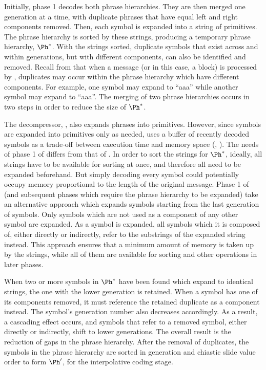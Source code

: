Initially, phase 1 decodes both phrase hierarchies.  
They are then merged one generation at a time, with duplicate
phrases that have equal left and right components removed.  
Then, each symbol
is expanded into a string of primitives.  The phrase hierarchy
is sorted by these strings, producing a temporary phrase
hierarchy, $\Ph^*$.  With the strings sorted, duplicate symbols
that exist across and within generations, but with different 
components, can also be identified and removed.  Recall from 
 that when a message (or in this
case, a block) is processed by \repair, duplicates may occur
within the phrase hierarchy which have different components.  For
example, one symbol may expand to ``a{\textbar}aa'' while
another symbol may expand to ``aa{\textbar}a''.  The merging
of two phrase hierarchies occurs in two steps in order to
reduce the size of $\Ph^*$.  

The \repair decompressor, \despair, also expands phrases into
primitives.  However, since symbols are expanded into primitives
only as needed, \despair uses a buffer of recently 
decoded symbols as a trade-off between execution time and 
memory space (, 
).  The
needs of phase 1 of \remerge differs from that of \despair.
In order to sort the strings for $\Ph^*$, ideally, all strings
have to be available for sorting at once, and therefore all
need to be expanded beforehand.
But simply decoding every symbol could potentially occupy
memory proportional to the length of the original message.
Phase 1 of \remerge
(and subsequent phases which require the phrase hierarchy
to be expanded) take an alternative approach which expands
symbols starting from the last generation of symbols.  
Only symbols 
which are not used as a component of any other symbol are
expanded.  As a symbol is expanded, all
symbols which it is composed of, either directly or
indirectly, refer to the substrings of the expanded string 
instead.  This approach ensures that a minimum amount
of memory is taken up by the strings, while all of them are 
available for sorting and other operations in later \remerge
phases.

When two or more symbols in $\Ph^*$ have been found
which expand to identical strings, the one with the lower
generation is retained.  When a symbol has one of its components 
removed, it must reference the retained duplicate as
a component instead.  The symbol's generation
number also decreases accordingly.  As a result, a cascading effect
occurs, and symbols that refer to a removed symbol, either
directly or indirectly, shift to lower generations.  The overall 
result is the reduction of gaps in the phrase hierarchy.  After 
the removal of duplicates, the symbols in the phrase hierarchy
are sorted in generation and chiastic slide value order to form
$\Ph'$, for the interpolative coding stage.

